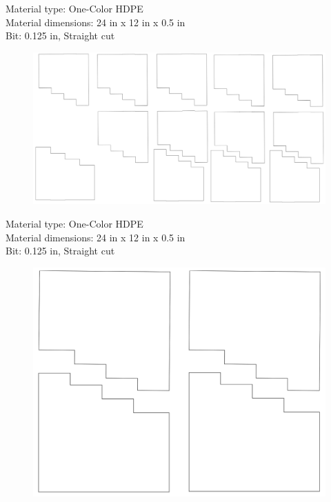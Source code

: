 \documentclass[11pt]{sig-alternate}
\begin{document}
\begin{large}
\clearpage
Material type: One-Color HDPE\\
Material dimensions: 24 in x 12 in x 0.5 in\\
Bit: 0.125 in, Straight cut
    \begin{figure}[h]
        \centering
        \includegraphics[width=\textwidth]{CNC pattern 2.png}
        \label{Image show a blue print with sizing/dimensions of the fabricated Bohr model.}
    \end{figure}

\clearpage 

Material type: One-Color HDPE\\
Material dimensions: 24 in x 12 in x 0.5 in\\
Bit: 0.125 in, Straight cut\\
    \begin{figure}[htp]
        \centering
        \includegraphics[width=\textwidth]{CNC pattern 3.png}
        \label{Image show a blueprint with sizing/dimensions of the fabricated Bohr model.}
    \end{figure}
    

\end{large}
\end{document}
